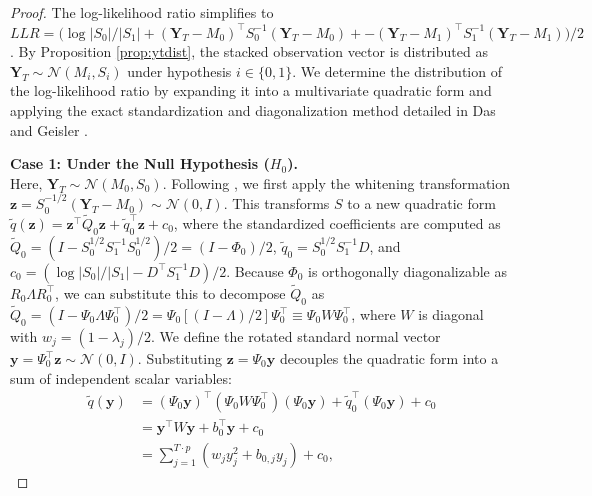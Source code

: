 \documentclass[letterpaper, 10 pt, conference]{ieeeconf}  %
\begin{document}
\begin{proof}
The log-likelihood ratio simplifies to $LLR = \big(\log |S_{0}|/|S_{1}| + (\mathbf{Y}_T - M_0)^\top S_0^{-1}(\mathbf{Y}_T - M_0) + 
    - (\mathbf{Y}_T - M_1)^\top S_1^{-1}(\mathbf{Y}_T - M_1) \big)/2$. By Proposition \ref{prop:ytdist}, the stacked observation vector is distributed as $\mathbf{Y}_T \sim \mathcal{N}(M_i, S_i)$ under hypothesis $i \in \{0, 1\}$. We determine the distribution of the log-likelihood ratio by expanding it into a multivariate quadratic form and applying the exact standardization and diagonalization method detailed in Das and Geisler \cite{das2020methods}.

\vspace{1ex}
\noindent \textbf{Case 1: Under the Null Hypothesis ($H_0$).} \\
Here, $\mathbf{Y}_T \sim \mathcal{N}(M_0, S_0)$. Following \cite{das2020methods}, we first apply the whitening transformation $\mathbf{z} = S_0^{-1/2}(\mathbf{Y}_T - M_0) \sim \mathcal{N}(0, I)$. This transforms $S$ to a new quadratic form $\tilde{q}(\mathbf{z}) = \mathbf{z}^\top \tilde{Q}_0 \mathbf{z} + \tilde{q}_0^\top \mathbf{z} + c_{0}$, where the standardized coefficients are computed as $\tilde{Q}_0 = (I - S_0^{1/2} S_1^{-1} S_0^{1/2})/2 = (I - \Phi_0)/2$, $\tilde{q}_0 = S_0^{1/2} S_1^{-1} D$, and $c_{0} = ( \log |S_0|/|S_1| - D^\top S_1^{-1} D )/2$. Because $\Phi_0$ is orthogonally diagonalizable as $R_0 \Lambda R_0^\top$, we can substitute this to decompose $\tilde{Q}_0$ as $\tilde{Q}_0 = (I - \Psi_0 \Lambda \Psi_0^\top)/2 = \Psi_0 [ (I - \Lambda)/2 ] \Psi_0^\top \equiv \Psi_0 W \Psi_0^\top$, where $W$ is diagonal with  $w_j = (1 - \lambda_j)/2$. We define the rotated standard normal vector $\mathbf{y} = \Psi_0^\top \mathbf{z} \sim \mathcal{N}(0, I)$. Substituting $\mathbf{z} = \Psi_0 \mathbf{y}$ decouples the quadratic form into a sum of independent scalar variables:
\begin{align}
    \tilde{q}(\mathbf{y}) &= (\Psi_0 \mathbf{y})^\top (\Psi_0 W \Psi_0^\top) (\Psi_0 \mathbf{y}) + \tilde{q}_0^\top (\Psi_0 \mathbf{y}) + c_{0} \nonumber \\
    &= \mathbf{y}^\top W \mathbf{y} + b_0^\top \mathbf{y} + c_{0} \nonumber \\
    &= \textstyle\sum_{j=1}^{T\cdot p} \left( w_j y_j^2 + b_{0,j} y_j \right) + c_{0},
\end{align}

\end{proof}
\end{document}
